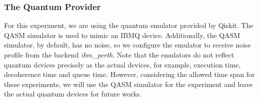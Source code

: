 \subsubsection{The Quantum Provider}
For this experiment, we are using the quantum emulator provided by Qiskit.
The QASM simulator is used to mimic an IBMQ device.
Additionally, the QASM simulator, by default, has no noise, so we configure the emulator to receive  noise profile from the backend \emph{ibm\_perth}.
Note that the emulators do not reflect quantum devices precisely as the actual devices, for example, execution time, decoherence time and queue time.
However, considering the allowed time span for these experiments, we will use the QASM simulator for the experiment and leave the actual quantum devices for future works.